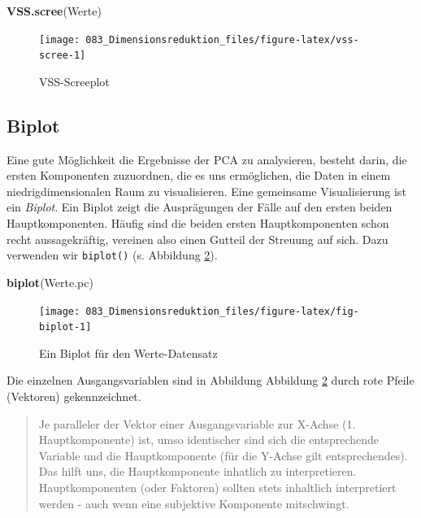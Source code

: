 \documentclass[12pt,ngerman,]{book}
\makeatletter
\newenvironment{Shaded}{\begin{snugshade}}{\end{snugshade}}
\newcommand{\KeywordTok}[1]{\textcolor[rgb]{0.13,0.29,0.53}{\textbf{#1}}}
\newcommand{\NormalTok}[1]{#1}
\newenvironment{kframe}{%
\medskip{}
\setlength{\fboxsep}{.8em}
 \def\at@end@of@kframe{}%
 \ifinner\ifhmode%
  \def\at@end@of@kframe{\end{minipage}}%
  \begin{minipage}{\columnwidth}%
 \fi\fi%
 \def\FrameCommand##1{\hskip\@totalleftmargin \hskip-\fboxsep
 \colorbox{shadecolor}{##1}\hskip-\fboxsep
     \hskip-\linewidth \hskip-\@totalleftmargin \hskip\columnwidth}%
 \MakeFramed {\advance\hsize-\width
   \@totalleftmargin\z@ \linewidth\hsize
   \@setminipage}}%
 {\par\unskip\endMakeFramed%
 \at@end@of@kframe}
\renewenvironment{Shaded}{\begin{kframe}}{\end{kframe}}
\theoremstyle{definition}
\theoremstyle{definition}
\theoremstyle{remark}
\makeatother
\begin{document}
\begin{Shaded}
\begin{Highlighting}[]
\KeywordTok{VSS.scree}\NormalTok{(Werte)}
\end{Highlighting}
\end{Shaded}

\begin{figure}

{\centering \texttt{[image: 083\_Dimensionsreduktion\_files/figure-latex/vss-scree-1]} 

}

\caption{VSS-Screeplot}\label{fig:vss-scree}
\end{figure}

\subsection{Biplot}\label{biplot}

Eine gute Möglichkeit die Ergebnisse der PCA zu analysieren, besteht
darin, die ersten Komponenten zuzuordnen, die es uns ermöglichen, die
Daten in einem niedrigdimensionalen Raum zu visualisieren. Eine
gemeinsame Visualisierung ist ein \emph{Biplot}. Ein
Biplot zeigt die Ausprägungen der Fälle auf den ersten beiden
Hauptkomponenten. Häufig sind die beiden ersten Hauptkomponenten schon
recht aussagekräftig, vereinen also einen Gutteil der Streuung auf sich.
Dazu verwenden wir \texttt{biplot()} (s. Abbildung
\ref{fig:fig-biplot}).

\begin{Shaded}
\begin{Highlighting}[]
\KeywordTok{biplot}\NormalTok{(Werte.pc)}
\end{Highlighting}
\end{Shaded}

\begin{figure}

{\centering \texttt{[image: 083\_Dimensionsreduktion\_files/figure-latex/fig-biplot-1]} 

}

\caption{Ein Biplot für den Werte-Datensatz}\label{fig:fig-biplot}
\end{figure}

Die einzelnen Ausgangsvariablen sind in Abbildung Abbildung
\ref{fig:fig-biplot} durch rote Pfeile (Vektoren) gekennzeichnet.

\begin{quote}
Je paralleler der Vektor einer Ausgangsvariable zur X-Achse (1.
Hauptkomponente) ist, umso identischer sind sich die entsprechende
Variable und die Hauptkomponente (für die Y-Achse gilt entsprechendes).
Das hilft uns, die Hauptkomponente inhatlich zu interpretieren.
Hauptkomponenten (oder Faktoren) sollten stets inhaltlich interpretiert
werden - auch wenn eine subjektive Komponente mitschwingt.
\end{quote}
\end{document}
